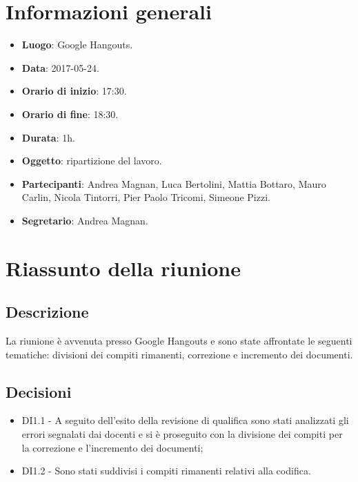 \documentclass[a4paper,titlepage]{article}
\begin{document}
\maketitle
\begin{diario}
\end{diario}
\newpage
\tableofcontents

\newpage
\section{Informazioni generali}
\label{sec:Informazioni}

\begin{itemize}
  \item \textbf{Luogo}: Google Hangouts.
  \item \textbf{Data}: 2017-05-24.
  \item \textbf{Orario di inizio}: 17:30.
  \item \textbf{Orario di fine}: 18:30.
  \item \textbf{Durata}: 1h.
  \item \textbf{Oggetto}: ripartizione del lavoro.
  \item \textbf{Partecipanti}: Andrea Magnan, Luca Bertolini, Mattia Bottaro, Mauro Carlin, Nicola Tintorri, Pier Paolo Tricomi, Simeone Pizzi.
  \item \textbf{Segretario}: Andrea Magnan.

\end{itemize}
\section{Riassunto della riunione}
\label{sec:RiassuntoRiunione}
 \subsection{Descrizione}
La riunione è avvenuta presso Google Hangouts e sono state affrontate le seguenti tematiche: divisioni dei compiti rimanenti, correzione e incremento dei documenti.
 \subsection{Decisioni}
 \begin{itemize}
  \item DI1.1 - A seguito dell'esito della revisione di qualifica sono stati analizzati gli errori segnalati dai docenti e si è proseguito con la divisione dei compiti per la correzione e l'incremento dei documenti;
  \item DI1.2 - Sono stati suddivisi i compiti rimanenti relativi alla codifica.
 \end{itemize}
\end{document}

